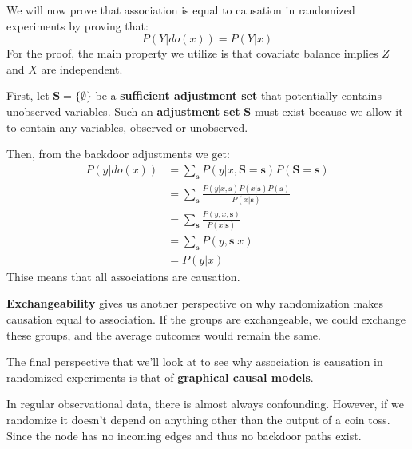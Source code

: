 We will now prove that association is equal to causation in randomized experiments
by proving that:
\begin{equation*}
    P(Y|do(x)) = P(Y|x)
\end{equation*}
For the proof, the main property we utilize is that covariate balance implies
$Z$ and $X$ are independent.

First, let $\mathbf{S} = \{\emptyset\}$ be a \textbf{sufficient adjustment set}
that potentially contains unobserved variables. Such an \textbf{adjustment set}
$\mathbf{S}$ must exist because we allow it to contain any variables, observed
or unobserved.

Then, from the backdoor adjustments we get:
\begin{equation}
    \begin{array}{ll}
        P(y|do(x)) & = \sum_{\mathbf{s}} P(y|x, \mathbf{S} = \mathbf{s})P(\mathbf{S} = \mathbf{s})                \\
                   & = \sum_{\mathbf{s}} \frac{P(y|x, \mathbf{s})P(x|\mathbf{s})P(\mathbf{s})}{P(x | \mathbf{s})} \\
                   & = \sum_{\mathbf{s}} \frac{P(y, x, \mathbf{s})}{P(x | \mathbf{s})}                            \\
                   & = \sum_{\mathbf{s}} P(y, \mathbf{s}| x)                                                      \\
                   & = P(y | x)
    \end{array}
\end{equation}
Thise means that all associations are causation.

\textbf{Exchangeability} gives us another perspective on why randomization makes
causation equal to association. If the groups are exchangeable, we could exchange
these groups, and the average outcomes would remain the same.

The final perspective that we'll look at to see why association is causation in
randomized experiments is that of \textbf{graphical causal models}.

In regular observational data, there is almost always confounding. However, if we
randomize it doesn't depend on anything other than the output of a coin toss.
Since the node has no incoming edges and thus no backdoor paths exist.